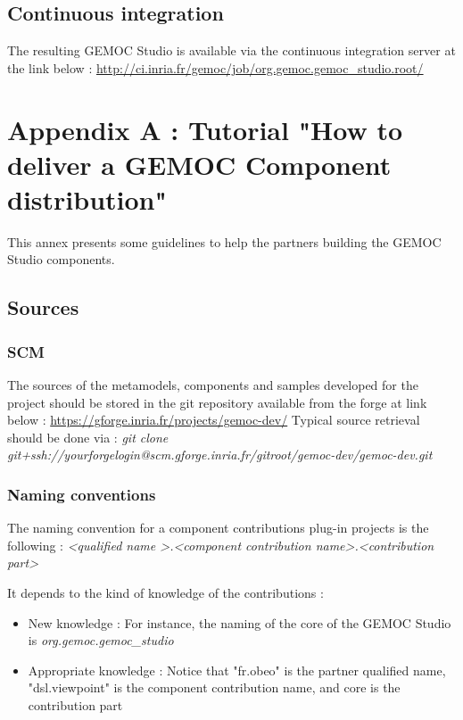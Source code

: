 \documentclass{gemoc} %
\begin{document}
\section{Continuous integration}
The resulting GEMOC Studio is available via the continuous integration server at the link below :
\newline
\url {http://ci.inria.fr/gemoc/job/org.gemoc.gemoc_studio.root/}


\newpage
\chapter{Appendix A : Tutorial "How to deliver a GEMOC Component distribution"}
This annex presents some guidelines to help the partners building the GEMOC Studio components.
\section{Sources}
\subsection{SCM}
The sources of the metamodels, components and samples developed for the project should be stored in the git repository available from the forge at link below :\newline
\url{https://gforge.inria.fr/projects/gemoc-dev/}
\newline\newline
Typical source retrieval should be done via :\newline
\textit{git clone git+ssh://yourforgelogin@scm.gforge.inria.fr/gitroot/gemoc-dev/gemoc-dev.git}
\subsection{Naming conventions}
The naming convention for a component contributions plug-in projects is the following :
\newline
\textit{\textless qualified name \textgreater.\textless component contribution name\textgreater .\textless contribution part\textgreater }
\newline

It depends to the kind of knowledge of the contributions :
\begin{itemize}
	\item New knowledge : For instance, the naming of the core of the GEMOC Studio is \textit{org.gemoc.gemoc\_studio}
	\item Appropriate knowledge : Notice that "fr.obeo" is the partner qualified name, "dsl.viewpoint" is the component contribution name, and core is the contribution part
\end{itemize}
\end{document}
